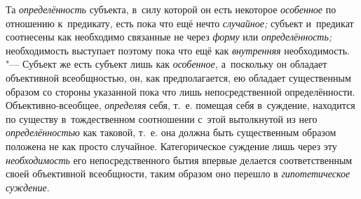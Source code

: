 Та {\em определённость} субъекта, в~силу которой он есть некоторое
{\em особенное} по отношению к~предикату, есть пока что ещё нечто
{\em случайное;} субъект и~предикат соотнесены как необходимо связанные
не через {\em форму} или {\em определённость;}
необходимость выступает поэтому пока что ещё как
{\em внутренняя} необходимость. "--- Субъект же есть субъект лишь
как {\em особенное,} а~поскольку он обладает объективной всеобщностью,
он, как предполагается, ею
обладает существенным образом со стороны указанной пока что лишь
непосредственной определённости. Объективно-всеобщее, {\em определяя} себя,
т.~е. помещая себя в~суждение, находится по существу в~тождественном
соотношении с~этой вытолкнутой из него {\em определённостью} как
таковой, т.~е. она должна быть существенным образом положена не как просто
случайное. Категорическое суждение лишь через эту {\em необходимость} его
непосредственного бытия впервые делается соответственным своей объективной
всеобщности, таким образом оно перешло в {\em гипотетическое суждение}.


